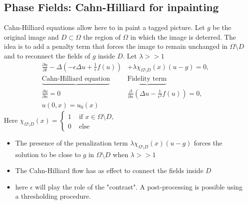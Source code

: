 \documentclass[hyperref={pdfpagemode=FullScreen},9pt]{beamer}
\newcommand{\Frac}[2] {\frac{\textstyle #1} {\textstyle #2}}
\begin{document}
 \subsection{Phase Fields: Cahn-Hilliard for inpainting}
\begin{frame}
Cahn-Hilliard equations allow here to in paint a tagged picture.
Let $g$ be the original image and $D\subset \Omega$  the region of $\Omega$ in which the image is deterred. The idea is to add a penalty term that forces the image to remain unchanged in $\Omega\setminus D$ and to reconnect the fields of $g$ inside $D$. Let $\lambda >>1$
\begin{eqnarray}
\Frac{\partial u}{\partial t} -\Delta( -\epsilon \Delta u +\Frac{1}{\epsilon}f(u))&+\lambda\chi_{\Omega\setminus D}(x)(u-g)=0,\\
\underbrace{\mbox{Cahn-Hilliard equation} }&\underbrace{\mbox{Fidelity term} }\\
\Frac{\partial u}{\partial n}=0&\Frac{\partial }{\partial n}\left(\Delta u-\Frac{1}{\epsilon^2}f(u)\right)=0,\\
u(0,x)=u_0(x)&
\end{eqnarray}
Here $\chi_{\Omega\setminus D}(x)=\left\{\begin{array}{ll}1 &\mbox{ if } x\in \Omega\setminus D,\\ 0 &\mbox{ else}\end{array}$
\begin{itemize}
\item The presence of the penalization  term $\lambda\chi_{\Omega\setminus D}(x)(u-g)$ forces the solution to be close to $g$ in $\Omega\setminus D$ when $\lambda>>1$
\item The Cahn-Hilliard flow has as effect to connect the fields inside $D$
\item here $\epsilon$ will play the role of the "contrast". A post-processing is possible using a thresholding procedure.
\end{itemize}
\end{frame}
\end{document}
